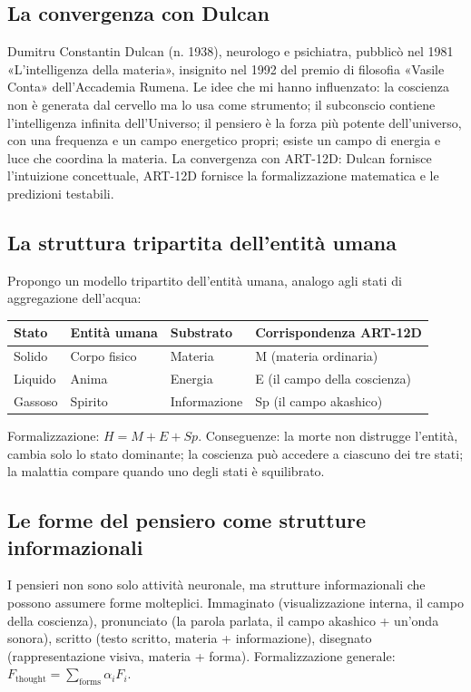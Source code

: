 \documentclass[11pt,a4paper]{article}
\begin{document}
\subsection{La convergenza con Dulcan}
Dumitru Constantin Dulcan (n. 1938), neurologo e psichiatra, pubblicò nel 1981 «L'intelligenza della materia», insignito nel 1992 del premio di filosofia «Vasile Conta» dell'Accademia Rumena. Le idee che mi hanno influenzato: la coscienza non è generata dal cervello ma lo usa come strumento; il subconscio contiene l'intelligenza infinita dell'Universo; il pensiero è la forza più potente dell'universo, con una frequenza e un campo energetico propri; esiste un campo di energia e luce che coordina la materia. La convergenza con ART-12D: Dulcan fornisce l'intuizione concettuale, ART-12D fornisce la formalizzazione matematica e le predizioni testabili.

\subsection{La struttura tripartita dell'entità umana}
Propongo un modello tripartito dell'entità umana, analogo agli stati di aggregazione dell'acqua:
\begin{table}[H]
\centering
\begin{tabular}{@{}llll@{}}
\toprule
\textbf{Stato} & \textbf{Entità umana} & \textbf{Substrato} & \textbf{Corrispondenza ART-12D} \\ \midrule
Solido & Corpo fisico & Materia & M (materia ordinaria) \\
Liquido & Anima & Energia & E (il campo della coscienza) \\
Gassoso & Spirito & Informazione & Sp (il campo akashico) \\ \bottomrule
\end{tabular}
\end{table}
Formalizzazione: $H = M + E + Sp$. Conseguenze: la morte non distrugge l'entità, cambia solo lo stato dominante; la coscienza può accedere a ciascuno dei tre stati; la malattia compare quando uno degli stati è squilibrato.

\subsection{Le forme del pensiero come strutture informazionali}
I pensieri non sono solo attività neuronale, ma strutture informazionali che possono assumere forme molteplici. Immaginato (visualizzazione interna, il campo della coscienza), pronunciato (la parola parlata, il campo akashico + un'onda sonora), scritto (testo scritto, materia + informazione), disegnato (rappresentazione visiva, materia + forma). Formalizzazione generale: $F_{\text{thought}} = \sum_{\text{forms}} \alpha_i F_i$.
\end{document}
